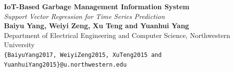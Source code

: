 \documentclass[a0,portrait]{a0poster}
\begin{document}
\begin{minipage}{\linewidth}
\centering
\VeryHuge \color{NavyBlue} \textbf{IoT-Based Garbage Management Information System} \color{Black}\\%
\Huge\textit{Support Vector Regression for Time Series Prediction}\\[1cm] %
\huge \textbf{Baiyu Yang, Weiyi Zeng, Xu Teng and Yuanhui Yang}\\[0.5cm] %
\huge Department of Electrical Engineering and Computer Science, Northwestern University\\[0.4cm] %
\Large \texttt{\{BaiyuYang2017, WeiyiZeng2015, XuTeng2015 and YuanhuiYang2015\}@u.northwestern.edu}\\
\end{minipage}

\vspace{1cm} %

\end{document}
